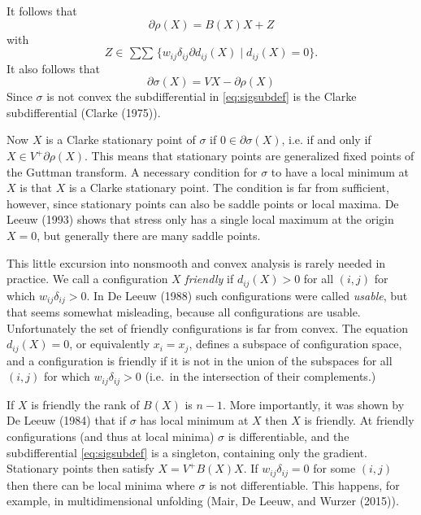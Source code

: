 \documentclass[
  12pt,
]{article}
\begin{document}
It follows that
\begin{equation}
\partial\rho(X)=B(X)X+Z
\label{eq:rhosubdef}
\end{equation}
with
\begin{equation}
Z\in\mathop{\sum\sum}\{w_{ij}\delta_{ij}\partial d_{ij}(X)\mid d_{ij}(X)=0\}.
\label{eq:zsubdef}
\end{equation}
It also follows that
\begin{equation}
\partial\sigma(X)=VX-\partial\rho(X)
\label{eq:sigsubdef}
\end{equation}
Since \(\sigma\) is not convex the subdifferential in \eqref{eq:sigsubdef} is
the Clarke subdifferential (Clarke (1975)).

Now \(X\) is a Clarke stationary point of \(\sigma\) if \(0\in\partial\sigma(X)\), i.e.
if and only if \(X\in V^+\partial\rho(X)\). This means that stationary
points are generalized fixed points of the Guttman transform.
A necessary condition for \(\sigma\) to have a local minimum at \(X\) is that \(X\) is a Clarke stationary point.
The condition is far from sufficient, however, since stationary points can also be saddle points or local maxima. De Leeuw (1993) shows that stress
only has a single local maximum at the origin \(X=0\), but generally there
are many saddle points.

This little excursion into nonsmooth and convex analysis is rarely needed in practice. We
call a configuration \(X\) \emph{friendly} if \(d_{ij}(X)>0\) for all \((i,j)\) for which \(w_{ij}\delta_{ij}>0\). In De Leeuw (1988) such configurations were called \emph{usable}, but that seems somewhat misleading, because all configurations are usable. Unfortunately the set of
friendly configurations is far from convex. The equation \(d_{ij}(X)=0\), or equivalently
\(x_i=x_j\), defines a subspace of configuration space, and a configuration is
friendly if it is not in the union of the subspaces for all \((i,j)\) for which
\(w_{ij}\delta_{ij}>0\) (i.e.~in the intersection of their complements.)

If \(X\) is friendly the rank of \(B(X)\) is \(n-1\). More importantly,
it was shown by De Leeuw (1984) that if \(\sigma\) has local minimum at \(X\)
then \(X\) is friendly. At friendly configurations (and thus at local minima)
\(\sigma\) is differentiable, and the subdifferential
\eqref{eq:sigsubdef} is a singleton, containing only the gradient.
Stationary points then satisfy \(X=V^+B(X)X\).
If \(w_{ij}\delta_{ij}=0\) for some \((i,j)\) then there can be local minima
where \(\sigma\) is not differentiable. This happens, for example, in
multidimensional unfolding (Mair, De Leeuw, and Wurzer (2015)).
\end{document}

